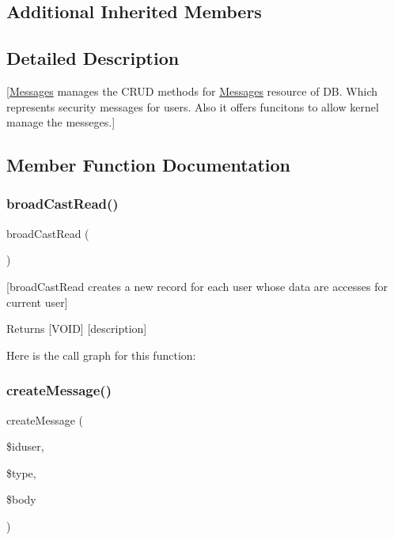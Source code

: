 \subsection*{Additional Inherited Members}


\subsection{Detailed Description}
\mbox{[}\mbox{\hyperlink{class_messages}{Messages}} manages the C\+R\+UD methods for \mbox{\hyperlink{class_messages}{Messages}} resource of DB. Which represents security messages for users. Also it offers funcitons to allow kernel manage the messeges.\mbox{]} 

\subsection{Member Function Documentation}
\mbox{\label{class_messages_ab62572471dcfdfd3352f83a82ee12925}} 
\subsubsection{\texorpdfstring{broad\+Cast\+Read()}{broadCastRead()}}
{\footnotesize\ttfamily broad\+Cast\+Read (\begin{DoxyParamCaption}{ }\end{DoxyParamCaption})}

\mbox{[}broad\+Cast\+Read creates a new record for each user whose data are accesses for current user\mbox{]} \begin{DoxyReturn}{Returns}
\mbox{[}V\+O\+ID\mbox{]} \mbox{[}description\mbox{]} 
\end{DoxyReturn}
Here is the call graph for this function\+:
\mbox{\label{class_messages_a625b4df587c67708409abc575f514e47}} 
\subsubsection{\texorpdfstring{create\+Message()}{createMessage()}}
{\footnotesize\ttfamily create\+Message (\begin{DoxyParamCaption}\item[{}]{\$iduser,  }\item[{}]{\$type,  }\item[{}]{\$body }\end{DoxyParamCaption})}

